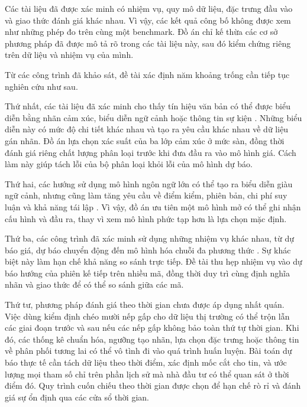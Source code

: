 Các tài liệu đã được xác minh có nhiệm vụ, quy mô dữ liệu, đặc trưng đầu vào và giao
thức đánh giá khác nhau. Vì vậy, các kết quả công bố không được xem như những phép đo
trên cùng một benchmark. Đồ án chỉ kế thừa các cơ sở phương pháp đã được mô tả rõ trong
các tài liệu này, sau đó kiểm chứng riêng trên dữ liệu và nhiệm vụ của mình.

Từ các công trình đã khảo sát, đề tài xác định năm khoảng trống cần tiếp tục nghiên
cứu như sau.

Thứ nhất, các tài liệu đã xác minh cho thấy tín hiệu văn bản có thể được biểu diễn bằng
nhãn cảm xúc, biểu diễn ngữ cảnh hoặc thông tin sự kiện
\cite{Chen2019_191005078v1,Chen2021_210708721v1}. Những biểu diễn này có mức độ chi tiết
khác nhau và tạo ra yêu cầu khác nhau về dữ liệu gán nhãn. Đồ án lựa chọn xác suất của
ba lớp cảm xúc ở mức sàn, đồng thời đánh giá riêng chất lượng phân loại trước khi đưa
đầu ra vào mô hình giá. Cách làm này giúp tách lỗi của bộ phân loại khỏi lỗi của mô hình
dự báo.

Thứ hai, các hướng sử dụng mô hình ngôn ngữ lớn có thể tạo ra biểu diễn giàu ngữ cảnh,
nhưng cũng làm tăng yêu cầu về điểm kiểm, phiên bản, chi phí suy luận và khả năng tái
lập \cite{Elahi2024_241101368v1,Liang2024_241210823v2,Siala2026_260200086v3}. Vì vậy,
đồ án ưu tiên một mô hình mở có thể ghi nhận cấu hình và đầu ra, thay vì xem mô hình
phức tạp hơn là lựa chọn mặc định.

Thứ ba, các công trình đã xác minh sử dụng những nhiệm vụ khác nhau, từ dự báo giá,
dự báo chuyển động đến mô hình hóa chuỗi đa phương thức
\cite{Halder2022_221107392v1,Gu2024_240716150v1,Chen2021_210708721v1,
Omranpour2024_241210540v1}. Sự khác biệt này làm hạn chế khả năng so sánh trực tiếp.
Đề tài thu hẹp nhiệm vụ vào dự báo hướng của phiên kế tiếp trên nhiều mã, đồng thời
duy trì cùng định nghĩa nhãn và giao thức để có thể so sánh giữa các mã.

Thứ tư, phương pháp đánh giá theo thời gian chưa được áp dụng nhất quán. Việc
dùng kiểm định chéo mười nếp gấp cho dữ liệu thị trường có thể trộn lẫn các giai đoạn
trước và sau nếu các nếp gấp không bảo toàn thứ tự thời gian. Khi đó, các thống kê
chuẩn hóa, ngưỡng tạo nhãn, lựa chọn đặc trưng hoặc thông tin về phân phối tương lai
có thể vô tình đi vào quá trình huấn luyện. Bài toán dự báo thực tế cần tách dữ liệu
theo thời điểm, xác định mốc cắt cho tin, và ước lượng mọi tham số chỉ trên phần lịch sử mà
nhà đầu tư có thể quan sát ở thời điểm đó. Quy trình cuốn chiếu theo thời gian được chọn để hạn chế
rò rỉ và đánh giá sự ổn định qua các cửa sổ thời gian.

